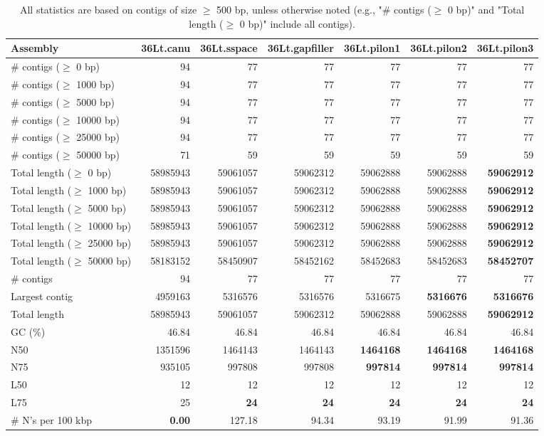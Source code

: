 \documentclass[12pt,a4paper]{article}
\begin{document}
\begin{table}[ht]
\begin{center}
\caption{All statistics are based on contigs of size $\geq$ 500 bp, unless otherwise noted (e.g., "\# contigs ($\geq$ 0 bp)" and "Total length ($\geq$ 0 bp)" include all contigs).}
\begin{tabular}{|l*{6}{|r}|}
\hline
Assembly & 36Lt.canu & 36Lt.sspace & 36Lt.gapfiller & 36Lt.pilon1 & 36Lt.pilon2 & 36Lt.pilon3 \\ \hline
\# contigs ($\geq$ 0 bp) & 94 & 77 & 77 & 77 & 77 & 77 \\ \hline
\# contigs ($\geq$ 1000 bp) & 94 & 77 & 77 & 77 & 77 & 77 \\ \hline
\# contigs ($\geq$ 5000 bp) & 94 & 77 & 77 & 77 & 77 & 77 \\ \hline
\# contigs ($\geq$ 10000 bp) & 94 & 77 & 77 & 77 & 77 & 77 \\ \hline
\# contigs ($\geq$ 25000 bp) & 94 & 77 & 77 & 77 & 77 & 77 \\ \hline
\# contigs ($\geq$ 50000 bp) & 71 & 59 & 59 & 59 & 59 & 59 \\ \hline
Total length ($\geq$ 0 bp) & 58985943 & 59061057 & 59062312 & 59062888 & 59062888 & {\bf 59062912} \\ \hline
Total length ($\geq$ 1000 bp) & 58985943 & 59061057 & 59062312 & 59062888 & 59062888 & {\bf 59062912} \\ \hline
Total length ($\geq$ 5000 bp) & 58985943 & 59061057 & 59062312 & 59062888 & 59062888 & {\bf 59062912} \\ \hline
Total length ($\geq$ 10000 bp) & 58985943 & 59061057 & 59062312 & 59062888 & 59062888 & {\bf 59062912} \\ \hline
Total length ($\geq$ 25000 bp) & 58985943 & 59061057 & 59062312 & 59062888 & 59062888 & {\bf 59062912} \\ \hline
Total length ($\geq$ 50000 bp) & 58183152 & 58450907 & 58452162 & 58452683 & 58452683 & {\bf 58452707} \\ \hline
\# contigs & 94 & 77 & 77 & 77 & 77 & 77 \\ \hline
Largest contig & 4959163 & 5316576 & 5316576 & 5316675 & {\bf 5316676} & {\bf 5316676} \\ \hline
Total length & 58985943 & 59061057 & 59062312 & 59062888 & 59062888 & {\bf 59062912} \\ \hline
GC (\%) & 46.84 & 46.84 & 46.84 & 46.84 & 46.84 & 46.84 \\ \hline
N50 & 1351596 & 1464143 & 1464143 & {\bf 1464168} & {\bf 1464168} & {\bf 1464168} \\ \hline
N75 & 935105 & 997808 & 997808 & {\bf 997814} & {\bf 997814} & {\bf 997814} \\ \hline
L50 & 12 & 12 & 12 & 12 & 12 & 12 \\ \hline
L75 & 25 & {\bf 24} & {\bf 24} & {\bf 24} & {\bf 24} & {\bf 24} \\ \hline
\# N's per 100 kbp & {\bf 0.00} & 127.18 & 94.34 & 93.19 & 91.99 & 91.36 \\ \hline
\end{tabular}
\end{center}
\end{table}
\end{document}
